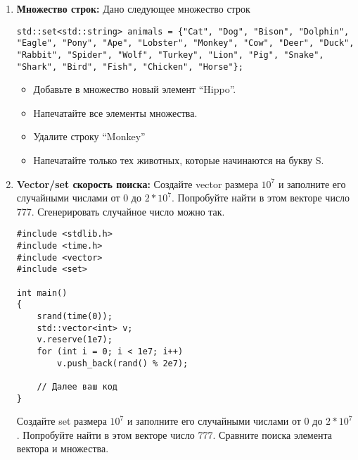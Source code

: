 \documentclass{article}
\begin{document}
\begin{enumerate}
\item \textbf{Множество строк:} Дано следующее множество строк
\begin{lstlisting}
std::set<std::string> animals = {"Cat", "Dog", "Bison", "Dolphin", "Eagle", "Pony", "Ape", "Lobster", "Monkey", "Cow", "Deer", "Duck", "Rabbit", "Spider", "Wolf", "Turkey", "Lion", "Pig", "Snake", "Shark", "Bird", "Fish", "Chicken", "Horse"};
\end{lstlisting}
\begin{itemize}
\item Добавьте в множество новый элемент ``Hippo''.
\item Напечатайте все элементы множества.
\item Удалите строку ``Monkey''
\item Напечатайте только тех животных, которые начинаются на букву S.
\end{itemize}


\item \textbf{Vector/set скорость поиска:} Создайте vector размера $10^7$ и заполните его случайными числами от 0 до $2*10^7$.  Попробуйте найти в этом векторе число 777. Сгенерировать случайное число можно так.
\begin{lstlisting}
#include <stdlib.h>
#include <time.h>
#include <vector>
#include <set>

int main()
{
    srand(time(0));
    std::vector<int> v;
    v.reserve(1e7);
    for (int i = 0; i < 1e7; i++)
    	v.push_back(rand() % 2e7);
    	
    // Далее ваш код
}
\end{lstlisting}
Создайте set размера $10^7$ и заполните его случайными числами от 0 до $2*10^7$.  Попробуйте найти в этом векторе число 777. Сравните поиска элемента вектора и множества.

\end{enumerate}
\end{document}
